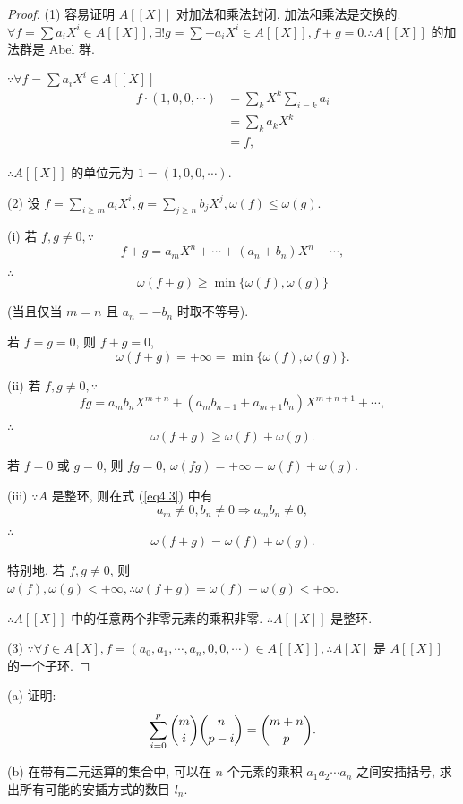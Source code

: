 \documentclass[UTF8]{ctexart}
\begin{document}
\begin{proof}
    (1) 容易证明 $A[[X]]$ 对加法和乘法封闭, 加法和乘法是交换的. $\forall f=\sum a_iX^i\in A[[X]],\exists! g=\sum-a_iX^i\in A[[X]],f+g=0.\therefore A[[X]]$ 的加法群是 Abel 群.

    $\because\forall f=\sum a_iX^i\in A[[X]]$
    \begin{align*}
        f\cdot(1,0,0,\cdots) & =\sum\limits_kX^k\sum\limits_{i=k}a_i \\
        & =\sum\limits_ka_kX^k \\
        & =f,
    \end{align*}

    $\therefore A[[X]]$ 的单位元为 $1=(1,0,0,\cdots)$.

    (2) 设 $f=\sum_{i\geq m}a_iX^i,g=\sum_{j\geq n}b_jX^j,\omega(f)\leq\omega(g)$.
    
    (i) 若 $f,g\neq0,\because$
    \[f+g=a_mX^n+\cdots+(a_n+b_n)X^n+\cdots,\]

    $\therefore$
    \[\omega(f+g)\geq\min\{\omega(f),\omega(g)\}\]

    (当且仅当 $m=n$ 且 $a_n=-b_n$ 时取不等号).

    若 $f=g=0$, 则 $f+g=0$,
    \[\omega(f+g)=+\infty=\min\{\omega(f),\omega(g)\}.\]

    (ii) 若 $f,g\neq0,\because$
    \begin{equation}\label{eq4.3}
        fg=a_mb_nX^{m+n}+(a_mb_{n+1}+a_{m+1}b_n)X^{m+n+1}+\cdots,
    \end{equation}

    $\therefore$
    \[\omega(f+g)\geq\omega(f)+\omega(g).\]

    若 $f=0$ 或 $g=0$, 则 $fg=0$, $\omega(fg)=+\infty=\omega(f)+\omega(g)$.

    (iii) $\because A$ 是整环, 则在式 (\ref{eq4.3}) 中有
    \[a_m\neq0,b_n\neq0\Rightarrow a_mb_n\neq0,\]

    $\therefore$
    \[\omega(f+g)=\omega(f)+\omega(g).\]

    特别地, 若 $f,g\neq0$, 则 $\omega(f),\omega(g)<+\infty,\therefore\omega(f+g)=\omega(f)+\omega(g)<+\infty$.

    $\therefore A[[X]]$ 中的任意两个非零元素的乘积非零. $\therefore A[[X]]$ 是整环.

    (3) $\because\forall f\in A[X],f=(a_0,a_1,\cdots,a_n,0,0,\cdots)\in A[[X]],\therefore A[X]$ 是 $A[[X]]$ 的一个子环.
\end{proof}
\begin{exercise}[2.6]\label{ex2.6}
    (a) 证明:
    \[\sum\limits_{i=0}^p\dbinom{m}{i}\dbinom{n}{p-i}=\dbinom{m+n}{p}.\]

    (b) 在带有二元运算的集合中, 可以在 $n$ 个元素的乘积 $a_1a_2\cdots a_n$ 之间安插括号, 求出所有可能的安插方式的数目 $l_n$.
\end{exercise}
\end{document}
